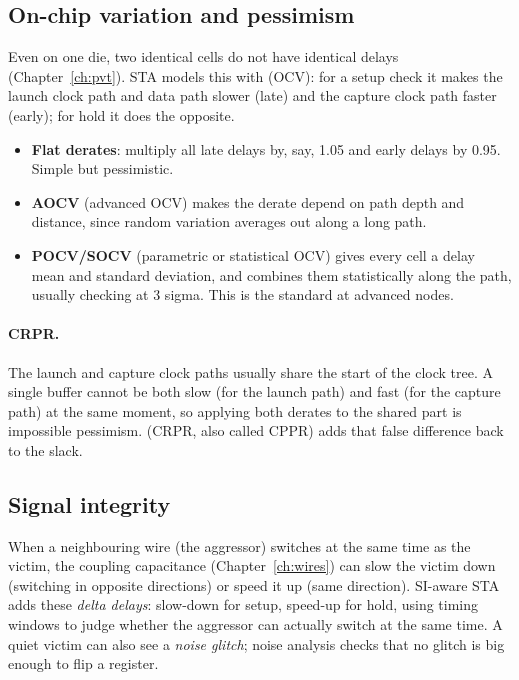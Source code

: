 \subsection*{On-chip variation and pessimism}

Even on one die, two identical cells do not have identical delays (Chapter~\ref{ch:pvt}). STA models this with  (OCV): for a setup check it makes the launch clock path and data path slower (late) and the capture clock path faster (early); for hold it does the opposite.

\begin{itemize}
  \item \textbf{Flat derates}: multiply all late delays by, say, 1.05 and early delays by 0.95. Simple but pessimistic.
  \item \textbf{AOCV} (advanced OCV) makes the derate depend on path depth and distance, since random variation averages out along a long path.
  \item \textbf{POCV/SOCV} (parametric or statistical OCV) gives every cell a delay mean and standard deviation, and combines them statistically along the path, usually checking at 3 sigma. This is the standard at advanced nodes.
\end{itemize}

\paragraph{CRPR.} The launch and capture clock paths usually share the start of the clock tree. A single buffer cannot be both slow (for the launch path) and fast (for the capture path) at the same moment, so applying both derates to the shared part is impossible pessimism.  (CRPR, also called CPPR) adds that false difference back to the slack.

\subsection*{Signal integrity}

When a neighbouring wire (the aggressor) switches at the same time as the victim, the coupling capacitance (Chapter~\ref{ch:wires}) can slow the victim down (switching in opposite directions) or speed it up (same direction). SI-aware STA adds these \emph{delta delays}: slow-down for setup, speed-up for hold, using timing windows to judge whether the aggressor can actually switch at the same time. A quiet victim can also see a \emph{noise glitch}; noise analysis checks that no glitch is big enough to flip a register.

